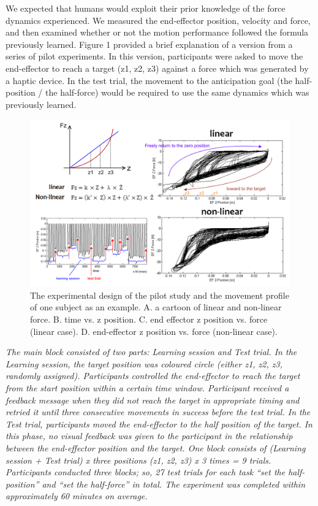 We expected that humans would exploit their prior knowledge of the force dynamics experienced. We measured the end-effector position, velocity and force, and then examined whether or not the motion performance followed the formula previously learned.  Figure 1 provided a brief explanation of a version from a series of pilot experiments. In this version, participants were asked to move the end-effector to reach a target (z1, z2, z3) against a force which was generated by a haptic device. In the test trial, the movement to the anticipation goal (the half-position / the half-force) would be required to use the same dynamics which was previously learned. 
\begin{figure}
  \centering
  \includegraphics[width=.7\textwidth]{Chie/figs/Figure1.png}
  \caption{The experimental design of the pilot study and the movement profile of one subject as an example. A. a cartoon of linear and non-linear force. B. time vs. z position.
C. end effector z position vs. force (linear case). D. end-effector z position vs. force (non-linear case).}
  \label{expdesign}
\end{figure}

\textit{The main block consisted of two parts: Learning session and Test trial. In the Learning session, the target position was coloured circle (either z1, z2, z3, randomly assigned). Participants controlled the end-effector to reach the target from the start position within a certain time window. Participant received a feedback message when they did not reach the target in appropriate timing and retried it until three consecutive movements in success before the test trial. In the Test trial, participants moved the end-effector to the half position of the target. In this phase, no visual feedback was given to the participant in the relationship between the end-effector position and the target. One block consists of (Learning session + Test trial) x three positions (z1, z2, z3) x 3 times = 9 trials. Participants conducted three blocks; so, 27 test trials for each task “set the half-position” and “set the half-force” in total. The experiment was completed within approximately 60 minutes on average.}

